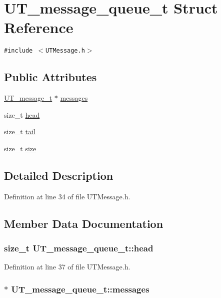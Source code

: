 \hypertarget{struct_u_t__message__queue__t}{
\section{UT\_\-message\_\-queue\_\-t Struct Reference}
\label{struct_u_t__message__queue__t}
}
{\tt \#include $<$UTMessage.h$>$}

\subsection*{Public Attributes}
\begin{CompactItemize}
\item 
\hyperlink{struct_u_t__message__t}{UT\_\-message\_\-t} $\ast$ \hyperlink{struct_u_t__message__queue__t_5998b2fde22952fff60a39b605bc7d66}{messages}
\item 
size\_\-t \hyperlink{struct_u_t__message__queue__t_fbee49c859b209abfaf3791d88f50804}{head}
\item 
size\_\-t \hyperlink{struct_u_t__message__queue__t_c503cec4378801aa04d045402b7056d5}{tail}
\item 
size\_\-t \hyperlink{struct_u_t__message__queue__t_a2ce94aaf9516409f8bdce88734cec4c}{size}
\end{CompactItemize}


\subsection{Detailed Description}


Definition at line 34 of file UTMessage.h.

\subsection{Member Data Documentation}
\hypertarget{struct_u_t__message__queue__t_fbee49c859b209abfaf3791d88f50804}{
\subsubsection[{head}]{\setlength{\rightskip}{0pt plus 5cm}size\_\-t {\bf UT\_\-message\_\-queue\_\-t::head}}}
\label{struct_u_t__message__queue__t_fbee49c859b209abfaf3791d88f50804}




Definition at line 37 of file UTMessage.h.\hypertarget{struct_u_t__message__queue__t_5998b2fde22952fff60a39b605bc7d66}{
\subsubsection[{messages}]{$\ast$ {\bf UT\_\-message\_\-queue\_\-t::messages}}}
\label{struct_u_t__message__queue__t_5998b2fde22952fff60a39b605bc7d66}




